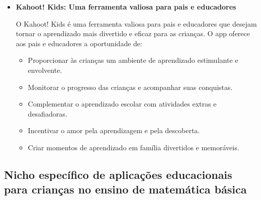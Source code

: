 \begin{itemize}
\item \textbf{Kahoot! Kids: Uma ferramenta valiosa para pais e educadores}

O Kahoot! Kids é uma ferramenta valiosa para pais e educadores que desejam tornar o aprendizado mais divertido e eficaz para as crianças. O app oferece aos pais e educadores a oportunidade de:

\begin{itemize}
    \item Proporcionar às crianças um ambiente de aprendizado estimulante e envolvente.
    \item Monitorar o progresso das crianças e acompanhar suas conquistas.
    \item Complementar o aprendizado escolar com atividades extras e desafiadoras.
    \item Incentivar o amor pela aprendizagem e pela descoberta.
    \item Criar momentos de aprendizado em família divertidos e memoráveis.
\end{itemize}

    \end{itemize}

\begin{table}[h!]
\centering
{}
\caption{Principais caracteristicas dos aplicativos educacionais para crianças}
\label{table:2}
\end{table}


\subsection{Nicho específico de aplicações educacionais para crianças no ensino de matemática básica}

